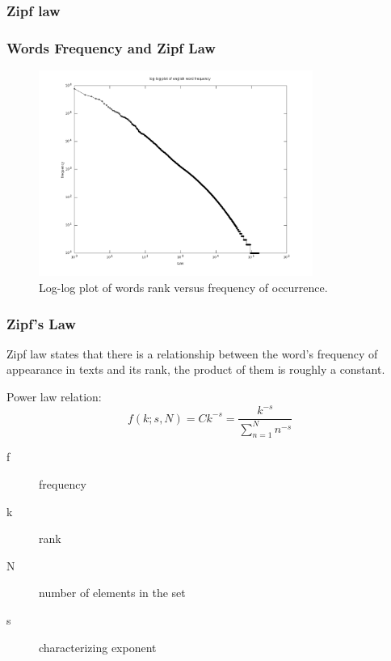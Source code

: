 \documentclass[notes]{beamer}
\begin{document}
\subsubsection{Zipf law}
\frame
{
  \frametitle{Words Frequency and Zipf Law}
  \vspace{-0.25cm}
  \begin{figure}[h!]
  \centering
  \includegraphics[width=0.8\textwidth]{images/wordfrequency_en.png}
  \vspace{-0.6cm}
  \caption{Log-log plot of words rank versus frequency of occurrence.}
  \label{fig:wordfrequency_en}
  \end{figure} 
}

\frame
{
  \frametitle{Zipf's Law}

 Zipf law states that there is a relationship between the word's frequency of appearance in texts and its rank, the product of them is roughly a constant.
 
 Power law relation: 
 \begin{equation}
 f(k;s,N) = Ck^{-s} = \frac{k^{-s}}{\sum_{n=1}^{N} n^{-s}}
 \end{equation}

 \begin{description}
 \item[f] frequency
 \item[k] rank
 \item[N] number of elements in the set
 \item[s] characterizing exponent
 \end{description}

}
\end{document}
